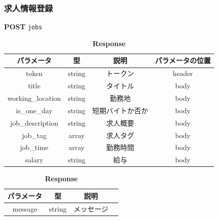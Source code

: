 \subsubsection*{求人情報登録}
\textbf{POST} \texttt{jobs}
\begin{table}[H]
  \begin{minipage}
    {0.5\hsize} \centering \captionsetup{labelformat=empty,labelsep=none} \caption{\textbf{Request}}
    \small
    \begin{tabular}{|c|c|c|c|} \hline
      パラメータ             & 型      & 説明       & パラメータの位置 \\ \hline \hline
      token             & string & トークン     & header   \\ \hline
      title             & string & タイトル     & body     \\ \hline
      working\_location & string & 勤務地      & body     \\ \hline
      is\_one\_day      & string & 短期バイトか否か & body     \\ \hline
      job\_description  & string & 求人概要     & body     \\ \hline
      job\_tag          & array  & 求人タグ     & body     \\ \hline
      job\_time         & array  & 勤務時間     & body     \\ \hline
      salary            & string & 給与       & body     \\ \hline
    \end{tabular}
  \end{minipage}
  \begin{minipage}
    {0.5\hsize} \centering \captionsetup{labelformat=empty,labelsep=none} \caption{\textbf{Response}}
    \begin{tabular}{|c|c|c|c|} \hline
      パラメータ   & 型      & 説明    \\ \hline \hline
      message & string & メッセージ \\ \hline
    \end{tabular}
  \end{minipage}
\end{table}


